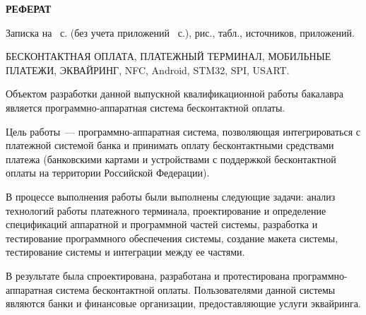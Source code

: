 \newpage

\begin{center}
	\textbf{РЕФЕРАТ}
\end{center}

Записка на~\pageref{LastPage} с. (без учета приложений~ с.),  рис., \totaltables{} табл.,  источников,  приложений.

БЕСКОНТАКТНАЯ ОПЛАТА, ПЛАТЕЖНЫЙ ТЕРМИНАЛ, МОБИЛЬНЫЕ ПЛАТЕЖИ, ЭКВАЙРИНГ, NFC, Android, STM32, SPI, USART.

Объектом разработки данной выпускной квалификационной работы бакалавра является программно-аппаратная система бесконтактной оплаты.

Цель работы~--- программно-аппаратная система, позволяющая интегрироваться с платежной системой банка и принимать оплату бесконтактными средствами платежа (банковскими картами и устройствами с поддержкой бесконтактной оплаты на территории Российской Федерации).

В процессе выполнения работы были выполнены следующие задачи: анализ технологий работы платежного терминала, проектирование и определение спецификаций аппаратной и программной частей системы, разработка и тестирование программного обеспечения системы, создание макета системы, тестирование системы и интеграции между ее частями.

В результате была спроектирована, разработана и протестирована программно-аппаратная система бесконтактной оплаты.
Пользователями данной системы являются банки и финансовые организации, предоставляющие услуги эквайринга.
